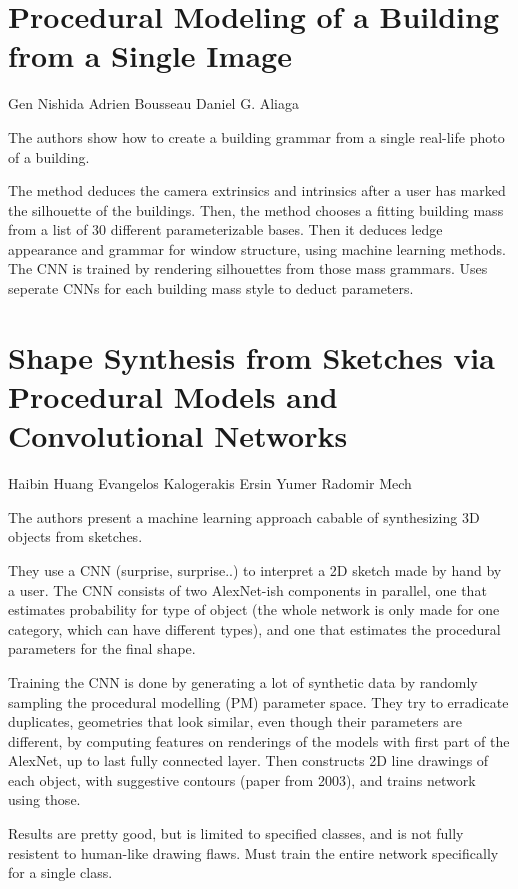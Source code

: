 \section*{Procedural Modeling of a Building from a Single Image}

Gen Nishida
Adrien Bousseau
Daniel G. Aliaga

The authors show how to create a building grammar from a single real-life photo of a building.

The method deduces the camera extrinsics and intrinsics after a user has marked the silhouette of the buildings. Then, the method chooses a fitting building mass from a list of 30 different parameterizable bases. Then it deduces ledge appearance and grammar for window structure, using machine learning methods. The CNN is trained by rendering silhouettes from those mass grammars. Uses seperate CNNs for each building mass style to deduct parameters.


\section*{Shape Synthesis from Sketches via Procedural Models and Convolutional Networks}

Haibin Huang
Evangelos Kalogerakis
Ersin Yumer
Radomir Mech

The authors present a machine learning approach cabable of synthesizing 3D objects from sketches.

They use a CNN (surprise, surprise..) to interpret a 2D sketch made by hand by a user. The CNN consists of two AlexNet-ish components in parallel, one that estimates probability for type of object (the whole network is only made for one category, which can have different types), and one that estimates the procedural parameters for the final shape. 

Training the CNN is done by generating a lot of synthetic data by randomly sampling the procedural modelling (PM) parameter space. They try to erradicate duplicates, geometries that look similar, even though their parameters are different, by computing features on renderings of the models with first part of the AlexNet, up to last fully connected layer. Then constructs 2D line drawings of each object, with suggestive contours (paper from 2003), and trains network using those. 

Results are pretty good, but is limited to specified classes, and is not fully resistent to human-like drawing flaws. Must train the entire network specifically for a single class.


